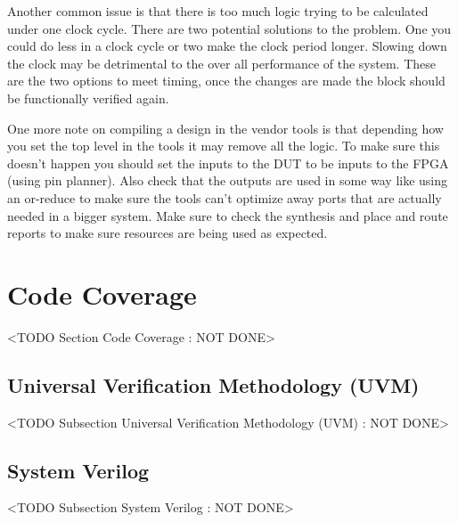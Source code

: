 Another common issue is that there is too much logic trying to be calculated under one clock cycle. There are two potential solutions to the problem. One you could do less in a clock cycle or two make the clock period longer. Slowing down the clock may be detrimental to the over all performance of the system. These are the two options to meet timing, once the changes are made the block should be functionally verified again.  

One more note on compiling a design in the vendor tools is that depending how you set the top level in the tools it may remove all the logic. To make sure this doesn't happen you should set the inputs to the \ac{DUT} to be inputs to the FPGA (using pin planner). Also check that the outputs are used in some way like using an or-reduce to make sure the tools can't optimize away ports that are actually needed in a bigger system. Make sure to check the synthesis and place and route reports to make sure resources are being used as expected. 
	
	
	
\section{Code Coverage}
	<TODO Section Code Coverage : NOT DONE>

\subsection{Universal Verification Methodology (UVM)}
	<TODO Subsection Universal Verification Methodology (UVM) : NOT DONE>

\subsection{System Verilog}
	<TODO Subsection System Verilog : NOT DONE>


